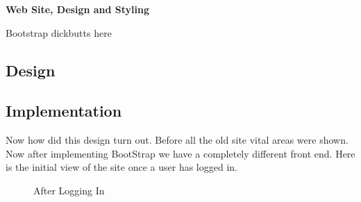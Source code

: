 \documentclass{report}
\begin{document}
\begin{center}
	\textbf{Web Site, Design and Styling}
\end{center}
\indent
Bootstrap dickbutts here
\newpage

\subsection*{Design}
\newpage

\subsection*{Implementation}
Now how did this design turn out. Before all the old site vital areas were shown. Now after implementing BootStrap we have a completely different front end.
Here is the initial view of the site once a user has logged in.
\begin{figure}[H]
	\caption{After Logging In}
\end{figure}
\newpage
\end{document}
